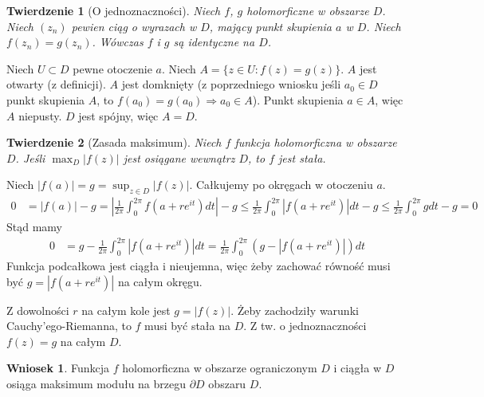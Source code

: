 \documentclass[11pt]{article}
\newcommand{\abs}[1]{\left|#1\right|} %
\theoremstyle{plain}
\newtheorem*{theorem}{Twierdzenie}
\theoremstyle{definition}
\newtheorem*{corollary}{Wniosek}
\theoremstyle{remark}
\let\oldendproof\endproof
\renewenvironment{proof}[1][\proofname]{
  \oldproof[\textsc{\small #1}]
}{\oldendproof}
\begin{document}

\begin{theorem}[O jednoznaczności]
  Niech $f$, $g$ holomorficzne w obszarze $D$.
  Niech $(z_n)$ pewien ciąg o wyrazach w $D$, mający punkt skupienia $a$ w $D$.
  Niech $ f(z_n) = g(z_n) $.
  Wówczas $f$ i $g$ są identyczne na $D$.
\end{theorem}

\begin{proof}
  Niech $ U \subset D $ pewne otoczenie $ a $.
  Niech $ A = \{ z \in U: f(z) = g(z) \} $.
  $ A $ jest otwarty (z definicji). %
  $ A $ jest domknięty (z poprzedniego wniosku jeśli $ a_0 \in D $ punkt skupienia $ A $, to $ f(a_0) = g(a_0) \Rightarrow a_0 \in A $).
  Punkt skupienia $ a \in A $, więc $ A $ niepusty.
  $ D $ jest spójny, więc $ A = D $.
\end{proof}

\begin{theorem}[Zasada maksimum]
  Niech $ f $ funkcja holomorficzna w obszarze $ D $.
  Jeśli $ \max_D \abs{f(z)} $ jest osiągane wewnątrz $ D $, to $ f $ jest stała.
\end{theorem}

\begin{proof}
  Niech $ \abs{f(a)} = g = \sup_{z \in D} \abs{f(z)} $. Całkujemy po okręgach w otoczeniu $ a $.
  \begin{align*}
    0 &
    = \abs{f(a)} - g
    = \abs{ \frac{1}{2 \pi} \int_{0}^{2 \pi} f(a + re^{it}) dt } - g
    \leq \frac{1}{2 \pi} \int_{0}^{2 \pi} \abs{f(a + re^{it})} dt - g
    \leq \frac{1}{2 \pi} \int_{0}^{2 \pi} g dt - g = 0
  \end{align*}
  Stąd mamy
  \begin{align*}
    0 &
    = g - \frac{1}{2 \pi} \int_{0}^{2 \pi} \abs{f(a + re^{it})} dt
    = \frac{1}{2 \pi} \int_{0}^{2 \pi} (g - \abs{f(a + re^{it})}) dt
  \end{align*}
  Funkcja podcałkowa jest ciągła i nieujemna, więc żeby zachować równość musi być $ g = \abs{f(a +re^{it})} $ na całym okręgu.

  Z dowolności $ r $ na całym kole jest $ g = \abs{f(z)} $.
  Żeby zachodziły warunki Cauchy’ego-Riemanna, to $ f $ musi być stała na $ D $.
  Z tw. o jednoznaczności $ f(z) = g $ na całym $ D $.
\end{proof}

\begin{corollary}
  Funkcja $f$ holomorficzna w obszarze ograniczonym $D$ i ciągła w $D$ osiąga maksimum modułu na brzegu $\partial D$ obszaru $D$.
\end{corollary}
\end{document}
